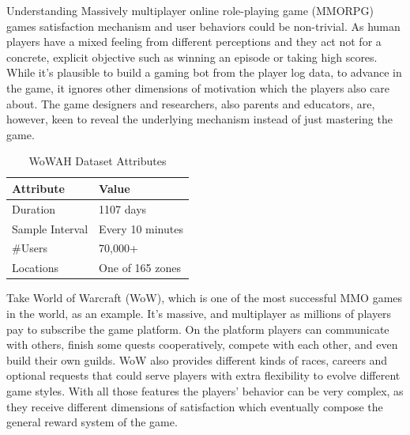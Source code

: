 \documentclass{sigchi}
\begin{document}
Understanding Massively multiplayer online role-playing game (MMORPG) games satisfaction mechanism and user behaviors could be non-trivial.
As human players have a mixed feeling from different perceptions and they act not for a concrete, explicit objective such as winning an episode or taking high scores.
While it's plausible to build a gaming bot from the player log data, to advance in the game, it ignores other dimensions of motivation which the players also care about.
The game designers and researchers, also parents and educators, are, however, keen to reveal the underlying mechanism instead of just mastering the game.

\begin{table}[t]
    \centering
    \caption{WoWAH Dataset Attributes}
    \begin{tabularx}{\textwidth}{lX}
        Attribute & Value \\
        \midrule
        Duration & 1107 days \\
        Sample Interval & Every 10 minutes \\
        \#Users & 70,000+ \\
        Locations & One of 165 zones
        \label{tbl:wowah}
    \end{tabularx}
\end{table}

Take World of Warcraft (WoW), which is one of the most successful MMO games in the world, as an example.
It's massive, and multiplayer as millions of players pay to subscribe the game platform.
On the platform players can communicate with others, finish some quests cooperatively, compete with each other, and even build their own guilds.
WoW also provides different kinds of races, careers and optional requests that could serve players with extra flexibility to evolve different game styles.
With all those features the players' behavior can be very complex, as they receive different dimensions of satisfaction which eventually compose the general reward system of the game.
\end{document}
